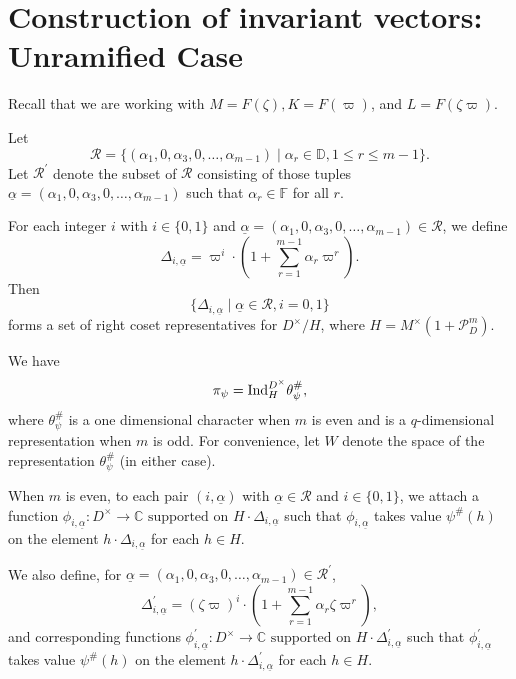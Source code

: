 \documentclass[12pt]{amsart}
\theoremstyle{definition}
\theoremstyle{remark}
\begin{document}
\section{Construction of invariant vectors: Unramified Case}\label{unramified}

Recall that we are working with $M = F(\zeta), K = F(\varpi)$, and $L = F(\zeta\varpi)$.

Let
\[\mathcal{R} =\{ (\alpha_1, 0, \alpha_3, 0, \dots, \alpha_{m-1}) \mid \alpha_r \in \mathbb D, 1 \leq r \leq m-1\}.\]
Let $\mathcal{R}^\prime$ denote the subset of $\mathcal{R}$ consisting of those tuples $\underline{\alpha}=(\alpha_1, 0, \alpha_3, 0, \dots, \alpha_{m-1})$ such that $\alpha_r \in \mathbb F$ for all $r$. 

For each integer $i$ with $i \in \{0,1\}$ and $\underline{\alpha}=(\alpha_1, 0, \alpha_3, 0, \dots, \alpha_{m-1}) \in \mathcal{R}$, we define
\[\Delta_{i,\underline{\alpha}} = \varpi^i \cdot (1 + \sum\limits_{r=1}^{m-1} \alpha_r  \varpi^r).\]
Then
\[\{\Delta_{i,\underline{\alpha}} \mid \underline{\alpha} \in \mathcal{R}, i= 0, 1\}\]
forms a set of right coset representatives for $D^\times/H$, where $H = M^\times(1+\mathcal P_D^m)$. 

We have
\[\pi_\psi = {\rm Ind}_H^{D^\times} \theta_\psi^\#,\]
where $\theta_\psi^\#$ is a one dimensional character when $m$ is even and is a $q$-dimensional representation when $m$ is odd. For convenience, let $W$ denote the space of the representation $\theta_\psi^\#$ (in either case). 

When $m$ is even, to each pair $(i,\underline{\alpha})$ with $\underline{\alpha} \in \mathcal{R}$ and $i \in \{0,1\}$, we attach a function 
$\phi_{i,\underline{\alpha}} : D^\times \rightarrow \mathbb C \text{ supported on } H \cdot \Delta_{i,\underline{\alpha}}$ 
such that $\phi_{i,\underline{\alpha}}$ takes value $\psi^\#(h)$ on the element $h \cdot \Delta_{i,\underline{\alpha}}$ for each $h \in H$.
 
We also define, for $\underline{\alpha}=(\alpha_1, 0, \alpha_3, 0, \dots, \alpha_{m-1}) \in \mathcal{R}^\prime$,
\[\Delta^\prime_{i,\underline{\alpha}}=(\zeta \varpi)^i \cdot (1 + \sum\limits_{r=1}^{m-1} \alpha_r \zeta \varpi^r),\]
and corresponding functions
$\phi^\prime_{i,\underline{\alpha}} : D^\times \rightarrow \mathbb C \text{ supported on } H \cdot \Delta^\prime_{i,\underline{\alpha}}$ 
such that $\phi^\prime_{i,\underline{\alpha}}$ takes value $\psi^\#(h)$ on the element $h \cdot \Delta^\prime_{i,\underline{\alpha}}$ for each $h \in H$. 
\end{document}
